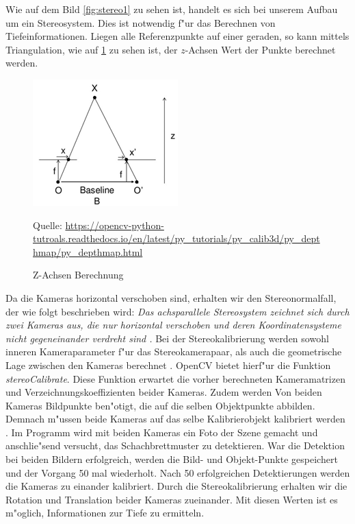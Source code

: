 Wie auf dem Bild \ref{fig:stereo1} zu sehen ist, handelt es sich bei unserem Aufbau um ein Stereosystem. Dies ist notwendig f"ur das Berechnen von Tiefeinformationen. Liegen alle Referenzpunkte auf einer geraden, so kann mittels Triangulation, wie auf \ref{fig:baseline} zu sehen ist, der $z$-Achsen Wert der Punkte berechnet werden.

\begin{figure}[H]
	\includegraphics[scale=1.5]{bilder/baseline}
	\caption[Z-Achsen Berechnung]{Z-Achsen Berechnung}
	\label{fig:baseline}%
	\small Quelle: \url{https://opencv-python-tutroals.readthedocs.io/en/latest/py_tutorials/py_calib3d/py_depthmap/py_depthmap.html}
\end{figure}

\noindent Da die Kameras horizontal verschoben sind, erhalten wir den Stereonormalfall, der wie folgt beschrieben wird: \textit{Das achsparallele Stereosystem zeichnet sich durch zwei Kameras aus, die nur horizontal verschoben und deren Koordinatensysteme nicht gegeneinander verdreht sind \cite{Tu}.} \newline
\noindent Bei der Stereokalibrierung werden sowohl inneren Kameraparameter f"ur das Stereokamerapaar, als auch die geometrische Lage zwischen den Kameras berechnet \cite{zbs}. OpenCV bietet hierf"ur die Funktion \textit{stereoCalibrate}. Diese Funktion erwartet die vorher berechneten Kameramatrizen und Verzeichnungskoeffizienten beider Kameras. Zudem werden Von beiden Kameras Bildpunkte ben"otigt, die auf die selben Objektpunkte abbilden. Demnach m"ussen beide Kameras auf das selbe Kalibrierobjekt kalibriert werden \cite{ocvs}. Im Programm wird mit beiden Kameras ein Foto der Szene gemacht und anschlie"send versucht, das Schachbrettmuster zu detektieren. War die Detektion bei beiden Bildern erfolgreich, werden die Bild- und Objekt-Punkte gespeichert und der Vorgang 50 mal wiederholt. Nach 50 erfolgreichen Detektierungen werden die Kameras zu einander kalibriert.\newline
Durch die Stereokalibrierung erhalten wir die Rotation und Translation beider Kameras zueinander. Mit diesen Werten ist es m"oglich, Informationen zur Tiefe zu ermitteln.

